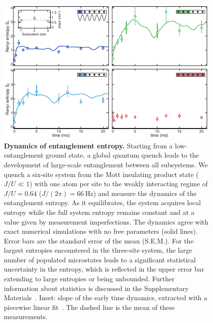 \begin{figure}[t!]
	\centering
	\includegraphics[scale=1.5]{figures/ETH_EE_dynamics.pdf}
	\caption{{\bf Dynamics of entanglement entropy. } Starting from a low-entanglement ground state, a global quantum quench leads to the development of large-scale entanglement between all subsystems. We quench a six-site system from the Mott insulating product state ($J/U\ll 1$) with one atom per site to the weakly interacting regime of $J/U=0.64$ ($J/(2\pi) = 66~\mathrm{Hz}$) and measure the dynamics of the entanglement entropy. As it equilibrates, the system acquires local entropy while the full system entropy remains constant and at a value given by measurement imperfections. The dynamics agree with exact numerical simulations with no free parameters (solid lines). Error bars are the standard error of the mean (S.E.M.). For the largest entropies encountered in the three-site system, the large number of populated microstates leads to a significant statistical uncertainty in the entropy, which is reflected in the upper error bar extending to large entropies or being unbounded. Further information about statistics is discussed in the Supplementary Materials~\cite{Supplement}. Inset: slope of the early time dynamics, extracted with a piecewise linear fit~\cite{Supplement}. The dashed line is the mean of these measurements.}
	\label{fig:EEDyn}
\end{figure} 

